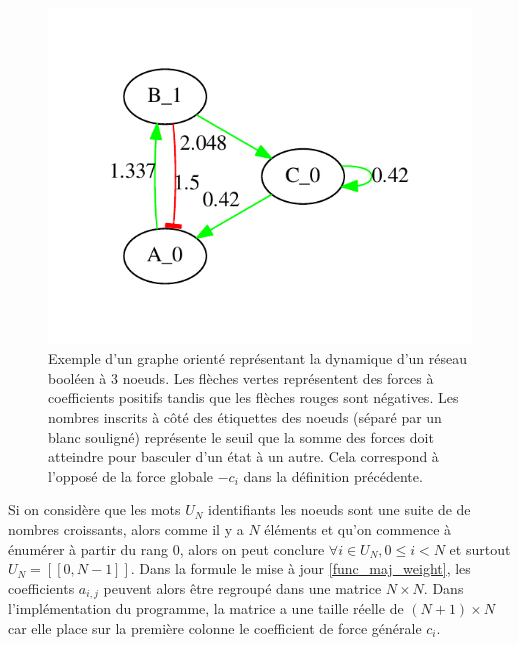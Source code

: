 \documentclass[11pt, a4paper]{article}
\begin{document}
\newpage
\begin{figure}[position]
    \begin{center}
        \includegraphics{example_weighted_graph}
        \caption{
            \label{ex_weighted_graph}
            Exemple d'un graphe orienté représentant la dynamique d'un réseau
            booléen à 3 noeuds. Les flèches vertes représentent des forces à
            coefficients positifs tandis que les flèches rouges sont négatives.
            Les nombres inscrits à côté des étiquettes des noeuds (séparé par
            un blanc souligné) représente le seuil que la somme des forces
            doit atteindre pour basculer d'un état à un autre.  Cela correspond
            à l'opposé de la force globale $-c_i$ dans la définition
            précédente.
        }
    \end{center}
\end{figure}

Si on considère que les mots $U_N$ identifiants les noeuds sont une suite de de
nombres croissants, alors comme il y a $N$ éléments et qu'on commence à
énumérer à partir du rang $0$, alors on peut conclure $ \forall i \in U_N, 0
\le i < N $ et surtout $ U_N = [\![0, N - 1]\!] $.  Dans la formule le mise à
jour \ref{func_maj_weight}, les coefficients $a_{i, j}$ peuvent alors être
regroupé dans une matrice $N\times N$.  Dans l'implémentation du programme, la
matrice a une taille réelle de $(N + 1)\times N$ car elle place sur la première
colonne le coefficient de force générale $c_i$.
\end{document}

